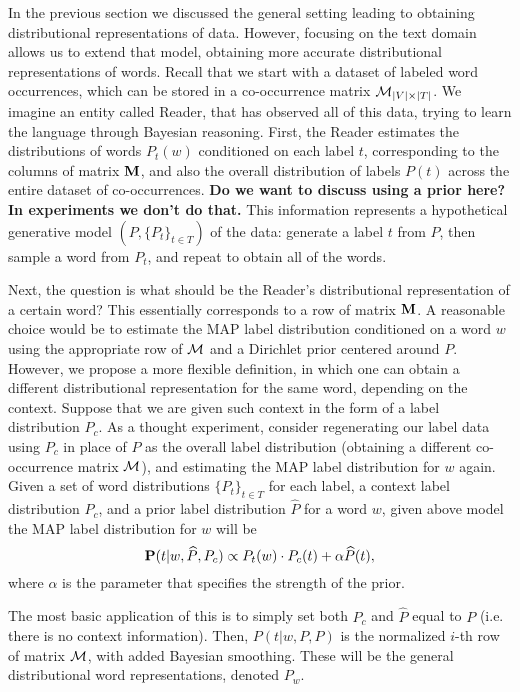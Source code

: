 In the previous section we discussed the general setting leading to
obtaining distributional representations of data. However, focusing on
the text domain allows us to extend that model, obtaining more
accurate distributional representations of words. Recall that we start
with a dataset of labeled word occurrences, which can be stored in a
co-occurrence matrix ${\mathcal M}_{|V|\times|T|}$. 
We imagine an entity
called Reader, that has observed all of this data, trying to learn the
language through Bayesian reasoning. First, the Reader estimates the
distributions of words $P_t(w)$ conditioned on each 
label $t$, corresponding to the columns of matrix $\operatorname{\mathbf{M}}$, and also
the overall distribution of labels $P(t)$ across the entire dataset of 
co-occurrences. 
{\bf Do we want to discuss using a prior here? In experiments we don't
  do that.}
This information represents a hypothetical generative model
$(P,\{P_t\}_{t\in T})$ of the
data: generate a label $t$ from $P$, then sample a word from $P_t$,
and repeat to obtain all of the words. 

Next, the question is what should be  
the Reader's distributional representation of a certain word? This
essentially corresponds to a row of matrix $\operatorname{\mathbf{M}}$. A reasonable choice
would be to estimate the MAP label distribution conditioned on a word
$w$ using the appropriate row of ${\mathcal M}$ and a Dirichlet prior centered
around $P$. However, we propose
a more flexible definition, in which one can obtain a different
distributional representation for the same word, depending on the
context. Suppose that we are given such context in the form of a label
distribution $P_c$. As a thought experiment, consider regenerating our
label data using $P_c$ in place of $P$ as the overall label
distribution (obtaining a different co-occurrence matrix ${\mathcal M}$), and
estimating the MAP label distribution for $w$ again.
\bep\label{map}
Given a set of word distributions $\{P_t\}_{t\in T}$ for each label, a context label
distribution $P_c$, and a prior label distribution $\widehat{P}$ for a word $w$,
given above model the MAP label distribution for $w$ will be
\[\operatorname{\mathbf{P}}(t|w,\widehat{P},P_c) \propto P_t(w)\cdot P_c(t) + \alpha
\widehat{P}(t),\]
where $\alpha$ is the parameter that specifies the strength of the prior.
\eep

The most basic application of this is to simply set
both $P_c$ and $\widehat{P}$ equal to $P$ (i.e. there is no context
information). Then, $P(t|w,P,P)$ is the
normalized $i$-th row of matrix ${\mathcal M}$, with added Bayesian
smoothing. These will be the general distributional word
representations, denoted $P_w$. 


